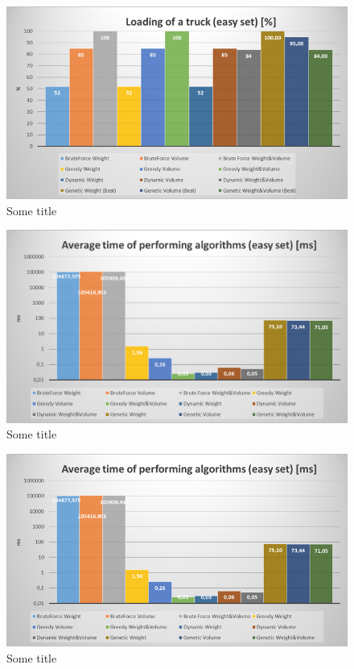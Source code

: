 \documentclass[conference,compsoc]{IEEEtran}
\begin{document}
\begin{figure}[H]
  \centering
  \includegraphics[width=\columnwidth]{image004.png}
  \caption{Some title}
\end{figure}

\begin{figure}[H]
  \centering
  \includegraphics[width=\columnwidth]{image006.png}
  \caption{Some title}
\end{figure}

\begin{figure}[H]
  \centering
  \includegraphics[width=\columnwidth]{image009.png}
  \caption{Some title}
\end{figure}
\end{document}
